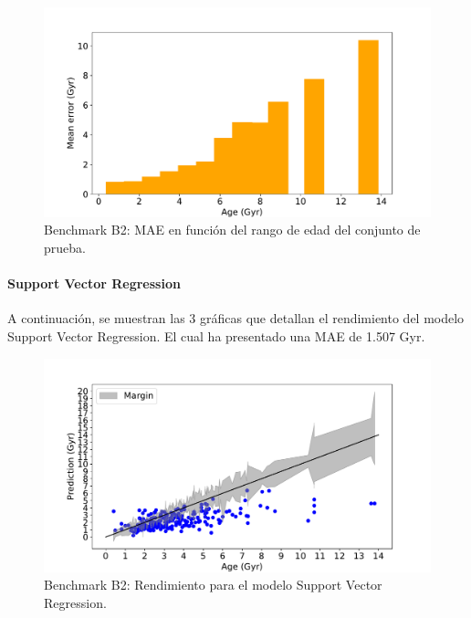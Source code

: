 \begin{figure}[H]
\begin{center}
 \includegraphics[width=0.8\linewidth]{Figuras/Experimentos/B_B2_rf_3.pdf}
\end{center}
\caption{Benchmark B2: MAE en función del rango de edad del conjunto de prueba.}
 \label{fig:benchB2_details_rf_3}
\end{figure}

\paragraph{Support Vector Regression} 
A continuación, se muestran las 3 gráficas que detallan el rendimiento del modelo Support Vector Regression. El cual ha presentado una MAE de 1.507 Gyr.
\begin{figure}[H]
\begin{center}
 \includegraphics[width=0.8\linewidth]{Figuras/Experimentos/B_B2_svm_1.pdf}
\end{center}
\caption{Benchmark B2: Rendimiento para el modelo Support Vector Regression.}
 \label{fig:benchB2_details_svm_1}
\end{figure}

